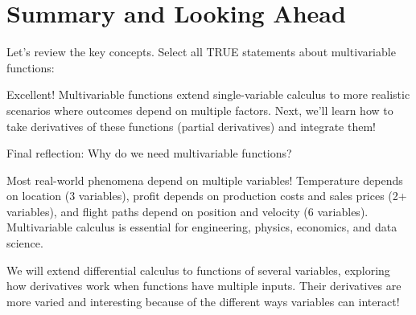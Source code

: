 \documentclass{ximera}
\begin{document}
\section*{Summary and Looking Ahead}

\begin{problem}
Let's review the key concepts. Select all TRUE statements about multivariable functions:

\begin{selectAll}
\end{selectAll}

\begin{feedback}
Excellent! Multivariable functions extend single-variable calculus to more realistic scenarios where outcomes depend on multiple factors. Next, we'll learn how to take derivatives of these functions (partial derivatives) and integrate them!
\end{feedback}
\end{problem}

\begin{problem}
Final reflection: Why do we need multivariable functions?

\begin{multipleChoice}
\end{multipleChoice}

\begin{feedback}
Most real-world phenomena depend on multiple variables! Temperature depends on location (3 variables), profit depends on production costs and sales prices (2+ variables), and flight paths depend on position and velocity (6 variables). Multivariable calculus is essential for engineering, physics, economics, and data science.

We will extend differential calculus to functions of several variables, exploring how derivatives work when functions have multiple inputs. Their derivatives are more varied and interesting because of the different ways variables can interact!
\end{feedback}
\end{problem}
\end{document}
